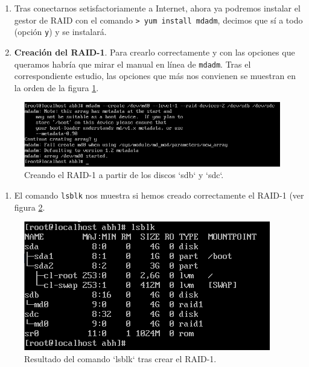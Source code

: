 \documentclass[
]{memoir}
\providecommand{\tightlist}{%
  \setlength{\itemsep}{0pt}\setlength{\parskip}{0pt}}
\begin{document}
\begin{enumerate}
\def\labelenumi{\arabic{enumi}.}
\setcounter{enumi}{3}
\item
  Tras conectarnos setisfactoriamente a Internet, ahora ya podremos instalar el gestor de RAID con el comando \texttt{\textgreater{}\ yum\ install\ mdadm}, decimos que sí a todo (opción \texttt{y}) y se instalará.
\item
  \textbf{Creación del RAID-1}. Para crearlo correctamente y con las opciones que queramos habría que mirar el manual en línea de \texttt{mdadm}. Tras el correspondiente estudio, las opciones que más nos convienen se muestran en la orden de la figura \ref{fig:5h}.
\end{enumerate}

\begin{figure}

{\centering \includegraphics[width=0.95\linewidth]{images/5} 

}

\caption{Creando el RAID-1 a partir de los discos `sdb` y `sdc`.}\label{fig:5h}
\end{figure}

\begin{enumerate}
\def\labelenumi{\arabic{enumi}.}
\setcounter{enumi}{5}
\tightlist
\item
  El comando \texttt{lsblk} nos muestra si hemos creado correctamente el RAID-1 (ver figura \ref{fig:6h}.
\end{enumerate}

\begin{figure}

{\centering \includegraphics[width=0.75\linewidth]{images/6} 

}

\caption{Resultado del comando `lsblk` tras crear el RAID-1.}\label{fig:6h}
\end{figure}
\end{document}
